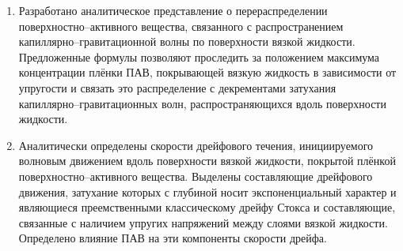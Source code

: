 \begin{enumerate}
	\item Разработано аналитическое представление о перераспределении поверхностно--активного вещества, связанного с распространением капиллярно--гравитационной волны по поверхности вязкой жидкости. Предложенные формулы позволяют проследить за положением максимума концентрации плёнки ПАВ, покрывающей вязкую жидкость в зависимости от упругости и связать это распределение с декрементами затухания капиллярно--гравитационных волн, распространяющихся вдоль поверхности жидкости.
	\item Аналитически определены скорости дрейфового течения, инициируемого волновым движением вдоль поверхности вязкой жидкости, покрытой плёнкой поверхностно--активного вещества. Выделены составляющие дрейфового движения, затухание которых с глубиной носит экспоненциальный характер и являющиеся преемственными классическому дрейфу Стокса и составляющие, связанные с наличием упругих напряжений между слоями вязкой жидкости. Определено влияние ПАВ на эти компоненты скорости дрейфа.
	
	
\end{enumerate}

